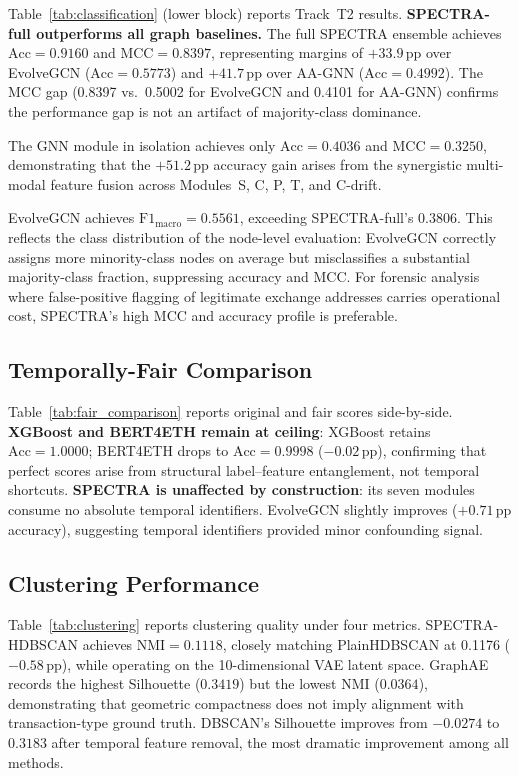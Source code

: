 \documentclass[journal]{IEEEtran}
\newcommand{\spectra}{\textsc{SPECTRA}}
\begin{document}
Table~\ref{tab:classification} (lower block) reports Track~T2 results.
\textbf{\spectra-full outperforms all graph baselines.}
The full \spectra{} ensemble achieves $\text{Acc} = \num{0.9160}$ and
$\text{MCC} = \num{0.8397}$, representing margins of $+\num{33.9}$\,pp over
EvolveGCN ($\text{Acc} = \num{0.5773}$) and $+\num{41.7}$\,pp over
AA-GNN ($\text{Acc} = \num{0.4992}$).
The MCC gap (0.8397 vs.\ 0.5002 for EvolveGCN and 0.4101 for AA-GNN)
confirms the performance gap is not an artifact of majority-class
dominance.

The GNN module in isolation achieves only $\text{Acc} = \num{0.4036}$ and
$\text{MCC} = \num{0.3250}$, demonstrating that the $+51.2$\,pp accuracy
gain arises from the synergistic multi-modal feature fusion across
Modules~S, C, P, T, and C-drift.

EvolveGCN achieves $\text{F1}_{\text{macro}} = \num{0.5561}$, exceeding
\spectra-full's $\num{0.3806}$.  This reflects the class distribution of
the node-level evaluation: EvolveGCN correctly assigns more minority-class
nodes on average but misclassifies a substantial majority-class fraction,
suppressing accuracy and MCC.  For forensic analysis where false-positive
flagging of legitimate exchange addresses carries operational cost, \spectra's
high MCC and accuracy profile is preferable.

\subsection{Temporally-Fair Comparison}
\label{subsec:fair_results}

Table~\ref{tab:fair_comparison} reports original and fair scores side-by-side.
\textbf{XGBoost and BERT4ETH remain at ceiling}: XGBoost retains
$\text{Acc} = \num{1.0000}$; BERT4ETH drops to $\text{Acc} = \num{0.9998}$
($-\num{0.02}$\,pp), confirming that perfect scores arise from structural
label--feature entanglement, not temporal shortcuts.
\textbf{\spectra{} is unaffected by construction}: its seven modules consume
no absolute temporal identifiers.
EvolveGCN slightly improves ($+0.71$\,pp accuracy), suggesting temporal
identifiers provided minor confounding signal.

\subsection{Clustering Performance}
\label{subsec:clustering_results}

Table~\ref{tab:clustering} reports clustering quality under four metrics.
\spectra-HDBSCAN achieves $\text{NMI} = \num{0.1118}$, closely matching
PlainHDBSCAN at \num{0.1176} ($-0.58$\,pp), while operating on the
10-dimensional VAE latent space.  GraphAE records the highest Silhouette
($\num{0.3419}$) but the lowest NMI ($\num{0.0364}$), demonstrating that
geometric compactness does not imply alignment with transaction-type ground
truth.  DBSCAN's Silhouette improves from $-\num{0.0274}$ to $\num{0.3183}$
after temporal feature removal, the most dramatic improvement among all
methods.
\end{document}
